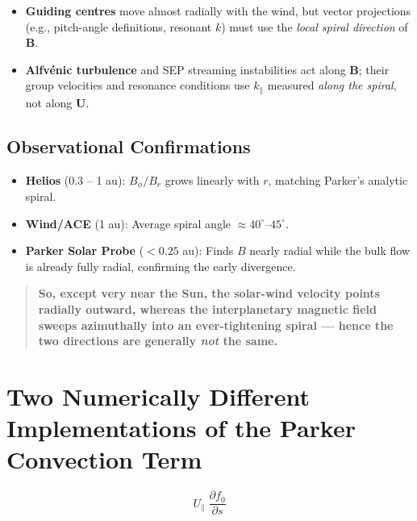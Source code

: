 \begin{itemize}
\item \textbf{Guiding centres} move almost radially with the wind, but vector projections (e.g., pitch-angle definitions, resonant $k$) must use the \emph{local spiral direction} of $\mathbf{B}$.
\item \textbf{Alfvénic turbulence} and SEP streaming instabilities act along $\mathbf{B}$; their group velocities and resonance conditions use $k_\parallel$ measured \emph{along the spiral}, not along $\mathbf{U}$.
\end{itemize}

\subsection*{Observational Confirmations}

\begin{itemize}
\item \textbf{Helios} (0.3 -- 1 au): $B_\phi/B_r$ grows linearly with $r$, matching Parker’s analytic spiral.
\item \textbf{Wind/ACE} (1 au): Average spiral angle $\approx 40^\circ$--$45^\circ$.
\item \textbf{Parker Solar Probe} ($<0.25$ au): Finds $B$ nearly radial while the bulk flow is already fully radial, confirming the early divergence.
\end{itemize}

\begin{quote}
\textbf{So, except very near the Sun, the solar-wind velocity points radially outward, whereas the interplanetary magnetic field sweeps azimuthally into an ever-tightening spiral --- hence the two directions are generally \emph{not} the same.}
\end{quote}



\section*{Two Numerically Different Implementations of the Parker Convection Term}

\[
U_{\parallel}\;\frac{\partial f_0}{\partial s}
\tag{Parker convection}
\]

